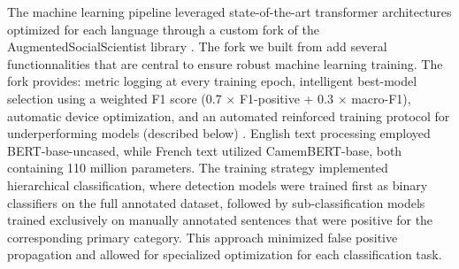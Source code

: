 \documentclass[12pt]{article}
\begin{document}
The machine learning pipeline leveraged state-of-the-art transformer architectures optimized for each language through a custom fork of the AugmentedSocialScientist library \autocite{doAugmentedSocialScientist2022,lemorAntoinelemorAugmentedSocialScientistFork2025}. The fork we built from \textcite{doAugmentedSocialScientist2022} add several functionnalities that are central to ensure robust machine learning training. The fork provides: metric logging at every training epoch, intelligent best-model selection using a weighted F1 score (0.7 × F1-positive + 0.3 × macro-F1), automatic device optimization, and an automated reinforced training protocol for underperforming models (described below) \autocite{lemorAntoinelemorAugmentedSocialScientistFork2025}. English text processing employed BERT-base-uncased, while French text utilized CamemBERT-base, both containing 110 million parameters. The training strategy implemented hierarchical classification, where detection models were trained first as binary classifiers on the full annotated dataset, followed by sub-classification models trained exclusively on manually annotated sentences that were positive for the corresponding primary category. This approach minimized false positive propagation and allowed for specialized optimization for each classification task.
\end{document}
